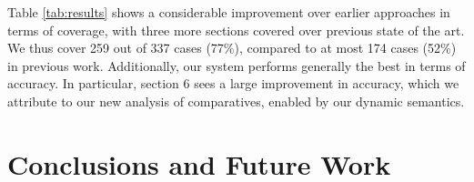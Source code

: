 \documentclass[11pt]{article}
\begin{document}
Table \ref{tab:results} shows a considerable improvement over earlier
approaches in terms of coverage, with three more sections covered over
previous state of the art. We thus cover 259 out of 337 cases (77\%),
compared to at most 174 cases (52\%) in previous work. Additionally,
our system performs generally the best in terms of accuracy. In
particular, section 6 sees a large improvement in accuracy, which we
attribute to our new analysis of comparatives, enabled by our dynamic
semantics.



\section{Conclusions and Future Work}




\end{document}
